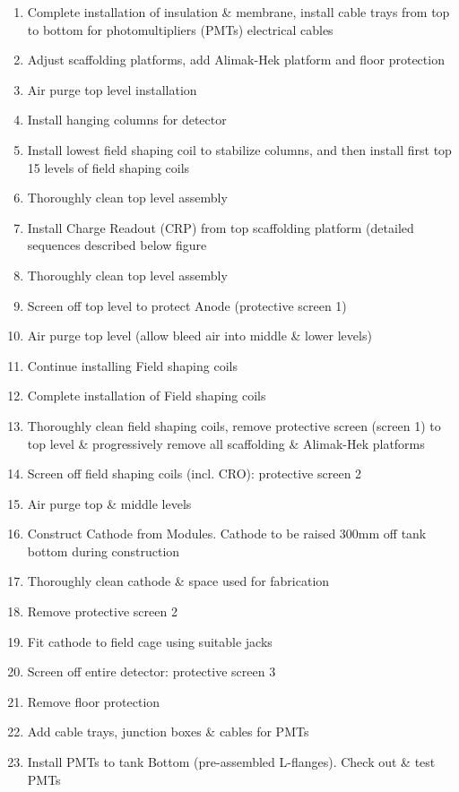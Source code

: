 \begin{enumerate}
\item{Complete installation of insulation \& membrane, install cable trays from top to bottom for photomultipliers (PMTs) electrical cables}
\item{Adjust scaffolding platforms, add Alimak-Hek platform and floor protection}
\item{Air purge top level installation}
\item{Install hanging columns for detector}
\item{Install lowest field shaping coil to stabilize columns, and then install first top 15 levels of field shaping coils}
\item{Thoroughly clean top level assembly}
\item{Install Charge Readout (CRP) from top scaffolding platform (detailed sequences described below figure }
\item{Thoroughly clean top level assembly}
\item{Screen off top level to protect Anode (protective screen 1)}
\item{Air purge top level (allow bleed air into middle \& lower levels)}
\item{Continue installing Field shaping coils}
\item{Complete installation of Field shaping coils}
\item{Thoroughly clean field shaping coils, remove protective screen (screen 1) to top level \& progressively remove all scaffolding \& Alimak-Hek platforms}
\item{Screen off field shaping coils (incl. CRO): protective screen 2}
\item{Air purge top \& middle levels}
\item{Construct Cathode from Modules. Cathode to be raised 300mm off tank bottom during construction}
\item{Thoroughly clean cathode \& space used for fabrication}
\item{Remove protective screen 2}
\item{Fit cathode to field cage using suitable jacks}
\item{Screen off entire detector: protective screen 3}
\item{Remove floor protection}
\item{Add cable trays, junction boxes \& cables for PMTs}
\item{Install PMTs to tank Bottom (pre-assembled L-flanges). Check out \& test PMTs}

\end{enumerate}

